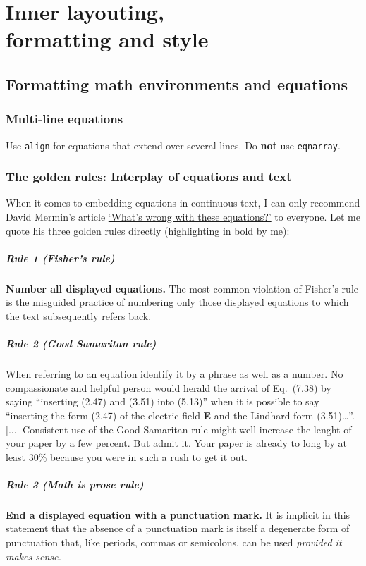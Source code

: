 \chapter[Inner layouting, formatting and style]{Inner layouting,\\ formatting and style}
\section{Formatting math environments and equations}

\subsection{Multi-line equations}
Use \verb|align| for equations that extend over several lines. Do \textbf{not} use \verb|eqnarray|.

\subsection{The golden rules: Interplay of equations and text}
When it comes to embedding equations in continuous text, I can only recommend David Mermin's article \href{https://wp.optics.arizona.edu/kupinski/wp-content/uploads/sites/91/2023/05/MerminEquations.pdf}{`What's wrong with these equations?'}\cite{mermin1989} to everyone. Let me quote his three golden rules directly (highlighting in bold by me):
\paragraph{Rule 1 (Fisher's rule)} \textbf{Number all displayed equations.} The most common violation of Fisher's rule is the misguided practice of numbering only those displayed equations to which the text subsequently refers back.
\paragraph{Rule 2 (Good Samaritan rule)} When referring to an equation identify it by a phrase as well as a number. No compassionate and helpful person would herald the arrival of Eq.~(7.38) by saying ``inserting (2.47) and (3.51) into (5.13)'' when it is possible to say ``inserting the form (2.47) of the electric field \textbf{E} and the Lindhard form (3.51)\dots''. [...] Consistent use of the Good Samaritan rule might well increase the lenght of your paper by a few percent. But admit it. Your paper is already to long by at least 30\% because you were in such a rush to get it out.
\paragraph{Rule 3 (Math is prose rule)} \textbf{End a displayed equation with a punctuation mark.} It is implicit in this statement that the absence of a punctuation mark is itself a degenerate form of punctuation that, like periods, commas or semicolons, can be used \emph{provided it makes sense.}


